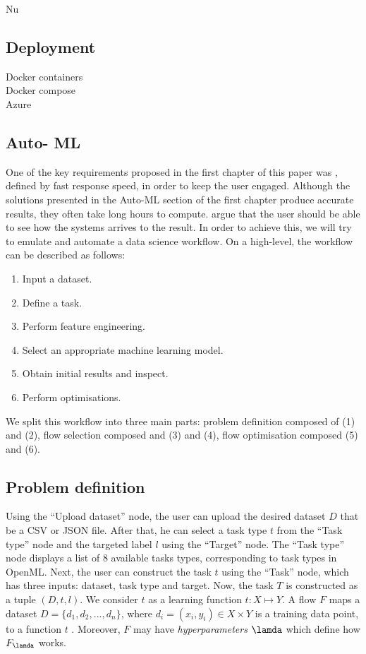 Nu\documentclass[11pt,twoside, a4paper]{report}
\begin{document}
\subsection{Deployment}
Docker containers \\
Docker compose \\
Azure \\


\subsection{Auto- ML}
One of the key requirements proposed in the first chapter of this paper was , defined by fast response speed, in order to keep the user engaged. Although the solutions presented in the Auto-ML section of the first chapter produce accurate results, they often take long hours to compute. \citeauthor{Shang2019a} argue that the user should be able to see how the systems arrives to the result. In order to achieve this, we will try to emulate and automate a data science workflow.
On a high-level, the workflow can be described as follows:
\begin{enumerate}
    \item Input a dataset.
    \item Define a task.
    \item Perform feature engineering.
    \item Select an appropriate machine learning model.
    \item Obtain initial results and inspect.
    \item Perform optimisations.
\end{enumerate}
We split this workflow into three main parts: problem definition composed of (1) and (2), flow selection composed and (3) and (4), flow optimisation composed (5) and (6). 

\subsection{Problem definition}

Using the ``Upload dataset'' node, the user can upload the desired dataset $D$ that be a CSV or JSON file. After that, he can select a task type $t$ from the ``Task type'' node and the targeted label $l$ using the ``Target'' node. The ``Task type'' node displays a list of 8 available tasks types, corresponding to task types in OpenML. Next, the user can construct the task $t$ using the ``Task'' node, which has three inputs: dataset, task type and target. Now, the task $T$ is constructed as a tuple $(D, t, l)$. 
We consider $t$ as a learning function $t:X \mapsto Y$. A flow $F$ maps a dataset $D=\{d_1, d_2, ... ,d_n\}$, where $d_i=(x_i, y_i) \in X \times Y$ is a training data point, to a function $t$ \parencite{Kotthoff2017}. Moreover, $F$ may have \emph{hyperparameters} $\lamda$ which define how $F_\lamda$ works.   
\end{document}
